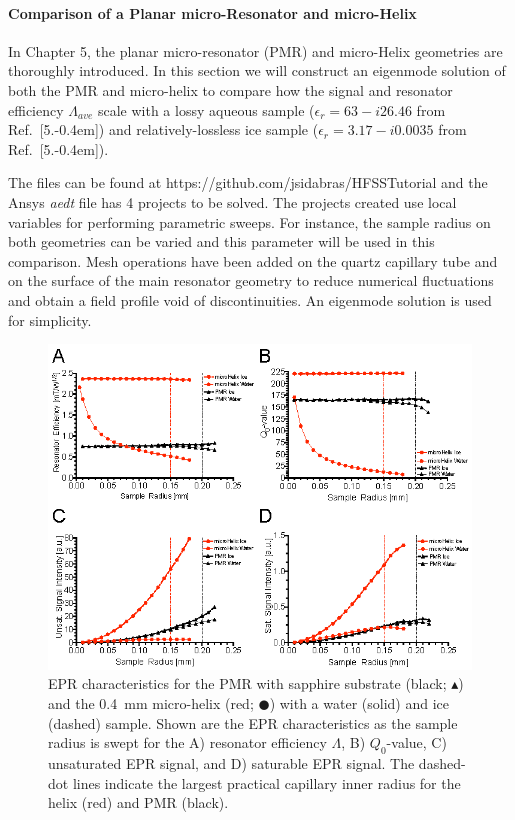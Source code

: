 \paragraph*{Comparison of a Planar micro-Resonator and micro-Helix}
In Chapter 5, the planar micro-resonator (PMR) \cite{Suter2005,Suter2008,suter2015} and micro-Helix geometries are thoroughly introduced. In this section we will construct an eigenmode solution of both the PMR and micro-helix to compare how the signal and resonator efficiency $\Lambda_{ave}$ scale with a lossy aqueous sample ($\epsilon_r = 63 - i26.46$ from Ref.~[5.\kern-0.4em]) and relatively-lossless ice sample ($\epsilon_r=3.17-i0.0035$ from Ref.~[5.\kern-0.4em]). 

The files can be found at https://github.com/jsidabras/HFSSTutorial and the Ansys \textit{aedt} file has 4 projects to be solved. The projects created use local variables for performing parametric sweeps. For instance, the sample radius on both geometries can be varied and this parameter will be used in this comparison. Mesh operations have been added on the quartz capillary tube and on the surface of the main resonator geometry to reduce numerical fluctuations and obtain a field profile void of discontinuities. An eigenmode solution is used for simplicity. 

\begin{figure}[ht]
 \centering
 \includegraphics[width=\textwidth]{Kapitel/Ch2-Images/Ch2-SweepOutput.eps}
 \caption[EPR characteristics as the sample radius is swept.]{EPR characteristics for the PMR with sapphire substrate (black; $\blacktriangle$) and the 0.4~mm micro-helix (red; $\CIRCLE$) with a water (solid) and ice (dashed) sample. Shown are the EPR characteristics as the sample radius is swept for the A) resonator efficiency $\Lambda$, B) $Q_0$-value, C) unsaturated EPR signal, and D) saturable EPR signal. The dashed-dot lines indicate the largest practical capillary inner radius for the helix (red) and PMR (black).}
 \label{fig:SweptData}
\end{figure}

